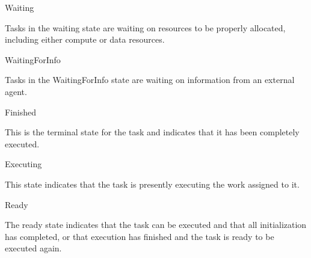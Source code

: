 Waiting

Tasks in the waiting state are waiting on resources to be properly allocated, including either compute or data resources.

WaitingForInfo

Tasks in the WaitingForInfo state are waiting on information from an external agent.

Finished

This is the terminal state for the task and indicates that it has been completely executed.

Executing

This state indicates that the task is presently executing the work assigned to it.

Ready

The ready state indicates that the task can be executed and that all initialization has completed, or that execution has finished and the task is ready to be executed again.
